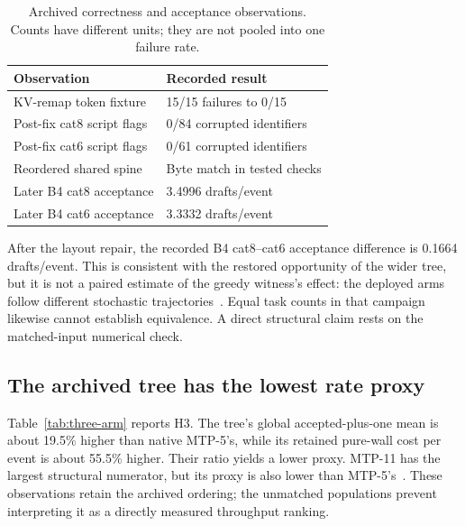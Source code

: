 \documentclass[conference]{IEEEtran}
\begin{document}
\begin{table}[t]
\caption{Archived correctness and acceptance observations. Counts have different units; they are not pooled into one failure rate.}
\label{tab:correctness}
\centering\footnotesize
\begin{tabularx}{\columnwidth}{@{}Yp{0.35\columnwidth}@{}}
\toprule
Observation & Recorded result \\
\midrule
KV-remap token fixture & 15/15 failures to 0/15 \\
Post-fix cat8 script flags & 0/84 corrupted identifiers \\
Post-fix cat6 script flags & 0/61 corrupted identifiers \\
Reordered shared spine & Byte match in tested checks \\
Later B4 cat8 acceptance & 3.4996 drafts/event \\
Later B4 cat6 acceptance & 3.3332 drafts/event \\
\bottomrule
\end{tabularx}
\end{table}

After the layout repair, the recorded B4 cat8--cat6 acceptance difference is 0.1664 drafts/event. This is consistent with the restored opportunity of the wider tree, but it is not a paired estimate of the greedy witness's effect: the deployed arms follow different stochastic trajectories~\cite{lumo2026spine}. Equal task counts in that campaign likewise cannot establish equivalence. A direct structural claim rests on the matched-input numerical check.

\subsection{The archived tree has the lowest rate proxy}
Table~\ref{tab:three-arm} reports H3. The tree's global accepted-plus-one mean is about 19.5\% higher than native MTP-5's, while its retained pure-wall cost per event is about 55.5\% higher. Their ratio yields a lower proxy. MTP-11 has the largest structural numerator, but its proxy is also lower than MTP-5's~\cite{lumo2026cost,lumo2026archive}. These observations retain the archived ordering; the unmatched populations prevent interpreting it as a directly measured throughput ranking.
\end{document}
